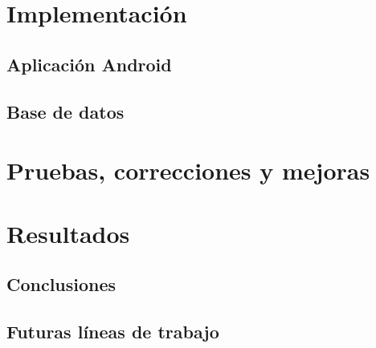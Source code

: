 \chapter{Implementación}

    \section{Aplicación Android}


    \section{Base de datos}


\cleardoublepage



\chapter{Pruebas, correcciones y mejoras}

\cleardoublepage



\chapter{Resultados}

    \section{Conclusiones}


    \section{Futuras líneas de trabajo}


\cleardoublepage
